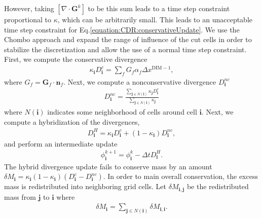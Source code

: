 \documentclass[letterpaper,10pt,english]{sphinxmanual}
\begin{document}
However, taking \([\nabla\cdot\mathbf{G}^k]\) to be this sum leads to a time step constraint proportional to \(\kappa\), which can be arbitrarily small.
This leads to an unacceptable time step constraint for Eq.\ref{equation:CDR:conservativeUpdate}.
We use the Chombo approach and expand the range of influence of the cut cells in order to stabilize the discretization and allow the use of a normal time step constraint.
First, we compute the conservative divergence
\begin{equation*}
\begin{split}\kappa_{\mathbf{i}} D_\mathbf{i}^c =  \sum_f G_f\alpha_f\Delta x^{\textrm{DIM} -1},\end{split}
\end{equation*}
where \(G_f = \mathbf{G}_f\cdot \mathbf{n}_f\). Next, we compute a non\sphinxhyphen{}conservative divergence \(D_{\mathbf{i}}^{nc}\)
\begin{equation*}
\begin{split}D_\mathbf{i}^{nc} =  \frac{\sum_{\mathbf{j}\in{N}\left(\mathbf{i}\right)}\kappa_{\mathbf{j}}D_\mathbf{i}^c}{\sum_{\mathbf{j}\in{N}\left(\mathbf{i}\right)}\kappa_{\mathbf{j}}}\end{split}
\end{equation*}
where \(N(\mathbf{i})\) indicates some neighborhood of cells around cell \(\mathbf{i}\). Next, we compute a hybridization of the divergences,
\begin{equation*}
\begin{split}D_{\mathbf{i}}^H = \kappa_{\mathbf{i}} D_{\mathbf{i}}^c + (1-\kappa_{\mathbf{i}})D_{\mathbf{i}}^{nc},\end{split}
\end{equation*}
and perform an intermediate update
\begin{equation*}
\begin{split}\phi_{\mathbf{i}}^{k+1} = \phi_{\mathbf{i}}^k - \Delta tD_{\mathbf{i}}^H.\end{split}
\end{equation*}
The hybrid divergence update fails to conserve mass by an amount \(\delta M_{\mathbf{i}} = \kappa_{\mathbf{i}}\left(1-\kappa_{\mathbf{i}}\right)\left(D_{\mathbf{i}}^c - D_{\mathbf{i}}^{nc}\right)\).
In order to main overall conservation, the excess mass is redistributed into neighboring grid cells.
Let \(\delta M_{\mathbf{i}, \mathbf{j}}\) be the redistributed mass from \(\mathbf{j}\) to \(\mathbf{i}\) where
\begin{equation*}
\begin{split}\delta M_{\mathbf{i}} = \sum_{\mathbf{j} \in N(\mathbf{i})}\delta M_{\mathbf{i}, \mathbf{i}}.\end{split}
\end{equation*}
\end{document}
